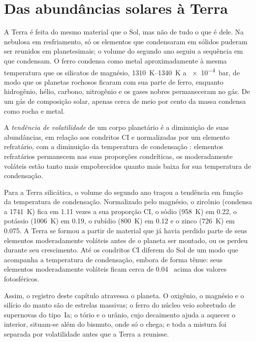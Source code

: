 \section{Das abundâncias solares à Terra}\label{sec:b3:origin-of-elements:earth}

A Terra é feita do mesmo material que o Sol, mas não de tudo o que é
dele. Na nebulosa em resfriamento, só os elementos que condensaram em sólidos
puderam ser reunidos em planetesimais; o volume do segundo ano seguiu a
sequência em que condensam. O ferro condensa como metal aproximadamente à
mesma temperatura que os silicatos de magnésio, \qtyrange{1310}{1340}{K} a
\qty{e-4}{bar}, de modo que os planetas rochosos ficaram com sua parte de ferro, enquanto
hidrogênio, hélio, carbono, nitrogênio e os gases nobres permaneceram no gás.
De um gás de composição solar, apenas cerca de meio por cento da massa
condensa como rocha e metal.

\begin{definition}\label{def:b3:origin-of-elements:volatility}
A \emph{tendência de volatilidade} de um corpo planetário
é a diminuição de suas abundâncias, em relação aos condritos CI e
normalizadas por um elemento refratário, com a diminuição da temperatura de condensação
: elementos refratários permanecem nas suas proporções condríticas,
os moderadamente voláteis estão tanto mais empobrecidos quanto mais baixa for sua
temperatura de condensação.
\end{definition}

Para a Terra silicática, o volume do segundo ano traçou a tendência em função da
temperatura de condensação. Normalizado pelo magnésio, o zircônio
(condensa a \qty{1741}{K}) fica em \num{1.11} vezes a sua
proporção CI, o sódio (\qty{958}{K}) em \num{0.22}, o potássio
(\qty{1006}{K}) em \num{0.19}, o rubídio (\qty{800}{K}) em \num{0.12}
e o zinco (\qty{726}{K}) em \num{0.075}. A Terra se formou a partir de material
que já havia perdido parte de seus elementos moderadamente voláteis antes de
o planeta ser montado, ou os perdeu durante seu crescimento. Até os condritos CI
diferem do Sol de um modo que acompanha a temperatura de condensação,
embora de forma tênue: seus elementos moderadamente voláteis ficam
cerca de \num{0.04}~ acima dos valores fotosféricos.

Assim, o registro deste capítulo atravessa o planeta. O oxigênio,
o magnésio e o silício do manto são  de estrelas massivas;
o ferro do núcleo veio sobretudo de supernovas do tipo~Ia;
o tório e o urânio, cujo decaimento ajuda a aquecer o interior, situam-se além do
bismuto, onde só o  chega; e toda a mistura foi
separada por volatilidade antes que a Terra a reunisse.


